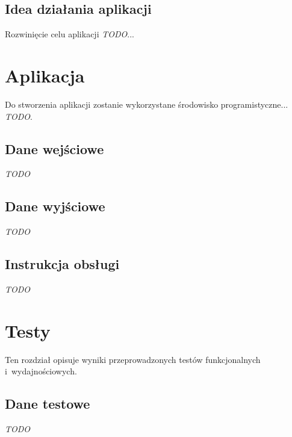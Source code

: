\documentclass[a4paper,titlepage]{article}
\theoremstyle{break}
\begin{document}
\subsection{Idea działania aplikacji}

Rozwinięcie celu aplikacji \emph{TODO}...


\section{Aplikacja}

Do stworzenia aplikacji zostanie wykorzystane środowisko programistyczne... \emph{TODO}.

\subsection{Dane wejściowe}

\emph{TODO}


\subsection{Dane wyjściowe}

\emph{TODO}


\subsection{Instrukcja obsługi}

\emph{TODO}


\section{Testy}

Ten rozdział opisuje wyniki przeprowadzonych testów funkcjonalnych i~wydajnościowych.

\subsection{Dane testowe}

\emph{TODO}
\end{document}
